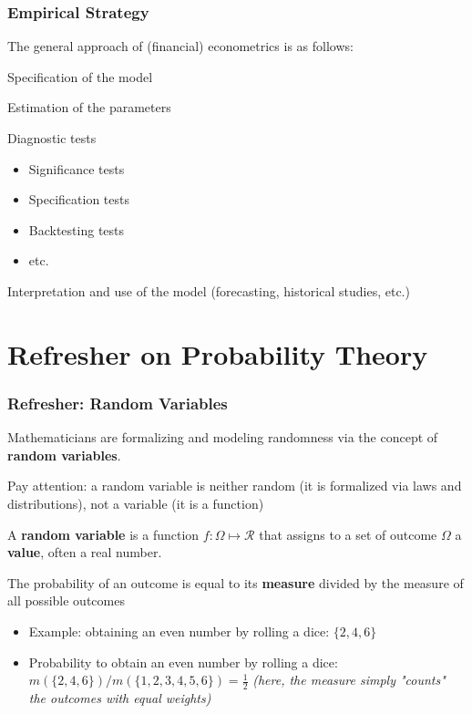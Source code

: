 \documentclass{beamer}
\newenvironment{wideitemize}{\itemize\addtolength{\itemsep}{10pt}}{\enditemize}
\newenvironment{wideenumerate}{\enumerate\addtolength{\itemsep}{10pt}}{\endenumerate}
\begin{document}
\begin{frame}
  \frametitle{Empirical Strategy}
  The general approach of (financial) econometrics is as follows:\\
  \smallskip

  \begin{wideenumerate}
  \item Specification of the model
  \item Estimation of the parameters
  \item Diagnostic tests
    \begin{itemize}
    \item Significance tests
    \item Specification tests
    \item Backtesting tests
    \item etc.
    \end{itemize}
  \item Interpretation and use of the model (forecasting, historical studies, etc.)
  \end{wideenumerate}
  
\end{frame}


\section{Refresher on Probability Theory}
\begin{frame}
  \frametitle{Refresher: Random Variables}
  \begin{wideitemize}
  \item Mathematicians are formalizing and modeling randomness via the concept of \textbf{random variables}.\\
  \item Pay attention: a random variable is neither random (it is formalized via laws and distributions), not a variable (it is a function)
  \item A \textbf{random variable} is a function $f: \Omega \mapsto \mathcal{R}$ that assigns to
      a set of outcome $\Omega$ a \textbf{value}, often a real number.
  \item The probability of an outcome is equal to its \textbf{measure} divided by
        the measure of all possible outcomes
     \begin{itemize}
      \item Example: obtaining an even number by rolling a dice: $\{2, 4, 6\}$
      \item Probability to obtain an even number by rolling a dice: $m(\{2, 4,
        6\})/m(\{1, 2, 3, 4, 5, 6\}) = \frac{1}{2}$ \emph{(here, the measure
          simply "counts" the outcomes with equal weights)}
        \end{itemize}     
  \end{wideitemize}  
\end{frame}
\end{document}

